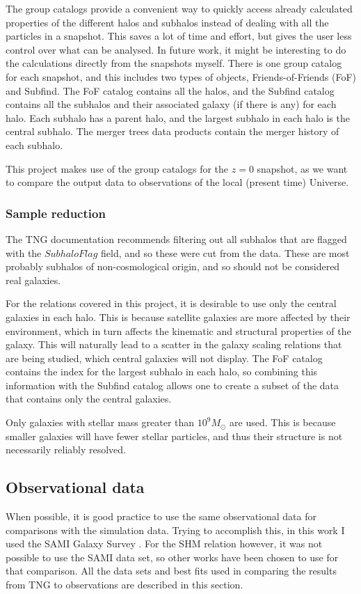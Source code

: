 The group catalogs provide a convenient way to quickly access already calculated properties of the different halos and subhalos instead of dealing with all the particles in a snapshot. This saves a lot of time and effort, but gives the user less control over what can be analysed. In future work, it might be interesting to do the calculations directly from the snapshots myself. There is one group catalog for each snapshot, and this includes two types of objects, Friends-of-Friends (FoF) and Subfind. The FoF catalog contains all the halos, and the Subfind catalog contains all the subhalos and their associated galaxy (if there is any) for each halo. Each subhalo has a parent halo, and the largest subhalo in each halo is the central subhalo. The merger trees data products contain the merger history of each subhalo.

This project makes use of the group catalogs for the $z = 0$ snapshot, as we want to compare the output data to observations of the local (present time) Universe.

\subsubsection{Sample reduction}

The TNG documentation recommends filtering out all subhalos that are flagged with the $SubhaloFlag$ field, and so these were cut from the data. These are most probably subhalos of non-cosmological origin, and so should not be considered real galaxies.

For the relations covered in this project, it is desirable to use only the central galaxies in each halo. This is because satellite galaxies are more affected by their environment, which in turn affects the kinematic and structural properties of the galaxy. This will naturally lead to a scatter in the galaxy scaling relations that are being studied, which central galaxies will not display. The FoF catalog contains the index for the largest subhalo in each halo, so combining this information with the Subfind catalog allows one to create a subset of the data that contains only the central galaxies.

Only galaxies with stellar mass greater than $10^9 M_{\odot}$ are used. This is because smaller galaxies will have fewer stellar particles, and thus their structure is not necessarily reliably resolved.

\subsection{Observational data}
When possible, it is good practice to use the same observational data for comparisons with the simulation data. Trying to accomplish this, in this work I used the SAMI Galaxy Survey . For the SHM relation however, it was not possible to use the SAMI data set, so other works have been chosen to use for that comparison. All the data sets and best fits used in comparing the results from TNG to observations are described in this section.

